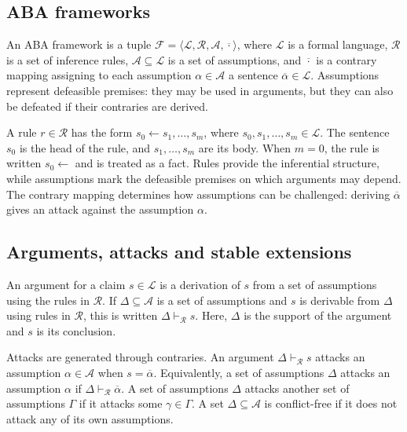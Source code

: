 \subsection{ABA frameworks}

An ABA framework is a tuple \(\mathcal{F} = \langle \mathcal{L}, \mathcal{R}, \mathcal{A}, \overline{\cdot} \rangle\), where \(\mathcal{L}\) is a formal language, \(\mathcal{R}\) is a set of inference rules, \(\mathcal{A} \subseteq \mathcal{L}\) is a set of assumptions, and \(\overline{\cdot}\) is a contrary mapping assigning to each assumption \(\alpha \in \mathcal{A}\) a sentence \(\overline{\alpha} \in \mathcal{L}\). Assumptions represent defeasible premises: they may be used in arguments, but they can also be defeated if their contraries are derived.

A rule \(r \in \mathcal{R}\) has the form \(s_0 \leftarrow s_1,\ldots,s_m\), where \(s_0,s_1,\ldots,s_m \in \mathcal{L}\). The sentence \(s_0\) is the head of the rule, and \(s_1,\ldots,s_m\) are its body. When \(m=0\), the rule is written \(s_0 \leftarrow\) and is treated as a fact. Rules provide the inferential structure, while assumptions mark the defeasible premises on which arguments may depend. The contrary mapping determines how assumptions can be challenged: deriving \(\overline{\alpha}\) gives an attack against the assumption \(\alpha\).

\subsection{Arguments, attacks and stable extensions}

An argument for a claim \(s \in \mathcal{L}\) is a derivation of \(s\) from a set of assumptions using the rules in \(\mathcal{R}\). If \(\Delta \subseteq \mathcal{A}\) is a set of assumptions and \(s\) is derivable from \(\Delta\) using rules in \(\mathcal{R}\), this is written \(\Delta \vdash_{\mathcal{R}} s\). Here, \(\Delta\) is the support of the argument and \(s\) is its conclusion.

Attacks are generated through contraries. An argument \(\Delta \vdash_{\mathcal{R}} s\) attacks an assumption \(\alpha \in \mathcal{A}\) when \(s = \overline{\alpha}\). Equivalently, a set of assumptions \(\Delta\) attacks an assumption \(\alpha\) if \(\Delta \vdash_{\mathcal{R}} \overline{\alpha}\). A set of assumptions \(\Delta\) attacks another set of assumptions \(\Gamma\) if it attacks some \(\gamma \in \Gamma\). A set \(\Delta \subseteq \mathcal{A}\) is conflict-free if it does not attack any of its own assumptions.

